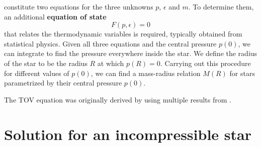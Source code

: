  constitute two equations for the three unknowns $p$, $\epsilon$ and $m$.
To determine them, an additional \textbf{equation of state}
\begin{equation}
	F(p, \epsilon) = 0
\end{equation}
that relates the thermodynamic variables is required, typically obtained from statistical physics.
Given all three equations and the central pressure $p(0)$, we can integrate to find the pressure everywhere inside the star.
We define the radius of the star to be the radius $R$ at which $p(R) = 0$.
Carrying out this procedure for different values of $p(0)$, we can find a mass-radius relation $M(R)$ for stars parametrized by their central pressure $p(0)$.

The TOV equation was originally derived by \cite{ref:tov} using multiple results from \cite{ref:tolman}.

\section{Solution for an incompressible star}
\label{sec:incompressible_star}


